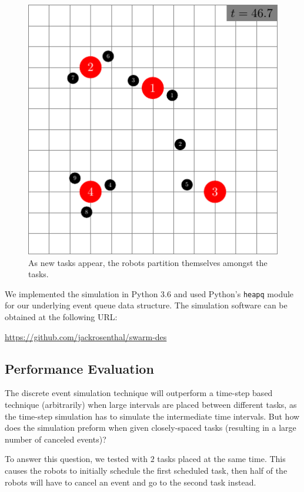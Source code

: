 \documentclass[conference,letterpaper]{IEEEtran}
\begin{document}
\begin{figure}[ht]
    \includegraphics[width=\linewidth]{sim468.pdf}

    \caption{As new tasks appear, the robots partition themselves amongst the
    tasks.}
    \label{fig:simlast}
\end{figure}

We implemented the simulation in Python 3.6 and used Python's \texttt{heapq}
module for our underlying event queue data structure. The simulation software
can be obtained at the following URL:

\url{https://github.com/jackrosenthal/swarm-des}

\subsection{Performance Evaluation}

The discrete event simulation technique will outperform a time-step based
technique (arbitrarily) when large intervals are placed between different tasks,
as the time-step simulation has to simulate the intermediate time intervals.
But how does the simulation preform when given closely-spaced tasks (resulting
in a large number of canceled events)?

To answer this question, we tested with $2$ tasks placed at the same time. This
causes the robots to initially schedule the first scheduled task, then half of
the robots will have to cancel an event and go to the second task instead.
\end{document}
